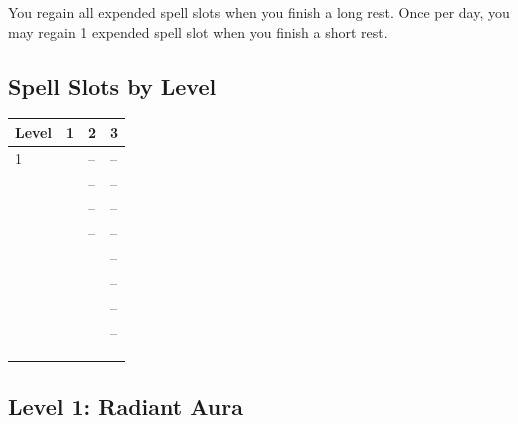 \documentclass[12pt,letterpaper,twocolumn,openany,nodeprecatedcode,bg=none]{dndbook}
\let\oldsubsection\subsection
\renewcommand{\subsection}[1]{%
  \needspace{5\baselineskip}%
  \oldsubsection{#1}%
}
\begin{document}
You regain all expended spell slots when you finish a long rest. Once
per day, you may regain 1 expended spell slot when you finish a short
rest.

\subsection{Spell Slots by Level}\label{spell-slots-by-level}


{\def\LTcaptype{none} %
\begin{table}[!htbp]
\centering
\begin{tabular}{@{}
  >{\raggedright\arraybackslash}p{}
  >{\raggedright\arraybackslash}p{}
  >{\raggedright\arraybackslash}p{}
  >{\raggedright\arraybackslash}p{}@{}}
\toprule\noalign{}
\begin{minipage}[b]{\linewidth}\raggedright
Level
\end{minipage} & \begin{minipage}[b]{\linewidth}\raggedright
1
\end{minipage} & \begin{minipage}[b]{\linewidth}\raggedright
2
\end{minipage} & \begin{minipage}[b]{\linewidth}\raggedright
3
\end{minipage} \\
\midrule\noalign{}
1 & 2 & -- & -- \\
2 & 2 & -- & -- \\
3 & 3 & -- & -- \\
4 & 3 & -- & -- \\
5 & 4 & 2 & -- \\
6 & 4 & 2 & -- \\
7 & 4 & 3 & -- \\
8 & 4 & 3 & -- \\
9 & 4 & 3 & 2 \\
10 & 4 & 3 & 2 \\
\bottomrule\noalign{}
\end{tabular}
\end{table}
}

\subsection{Level 1: Radiant Aura}\label{level-1-radiant-aura}
\end{document}
